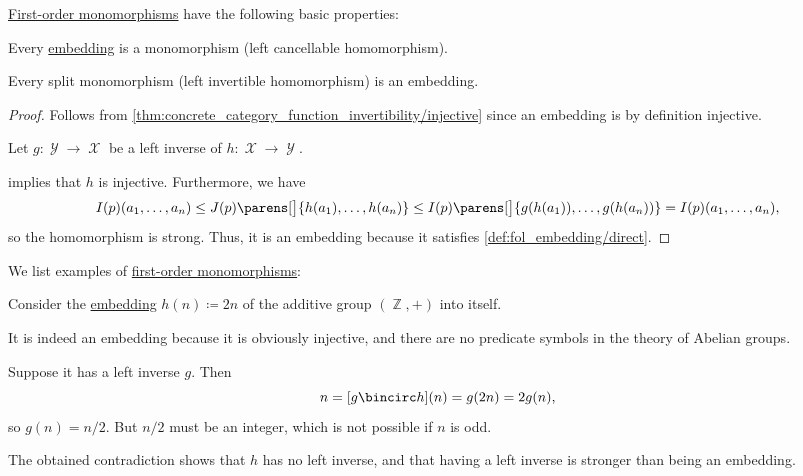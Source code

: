 \begin{proposition}\label{thm:def:fol_monomorphisms}
  \hyperref[def:fol_monomorphism]{First-order monomorphisms} have the following basic properties:
  \begin{thmenum}
     Every \hyperref[def:fol_embedding]{embedding} is a monomorphism (left cancellable homomorphism).

     Every split monomorphism (left invertible homomorphism) is an embedding.
  \end{thmenum}
\end{proposition}
\begin{proof}
   Follows from \cref{thm:concrete_category_function_invertibility/injective} since an embedding is by definition injective.

   Let \( g: \mscrY \to \mscrX \) be a left inverse of \( h: \mscrX \to \mscrY \).

   implies that \( h \) is injective. Furthermore, we have
  \begin{equation*}
    I(p)(a_1, \ldots, a_n)
    \leq
    J(p)\parens[\big]{ h(a_1), \ldots, h(a_n) }
    \leq
    I(p)\parens[\big]{ g(h(a_1)), \ldots, g(h(a_n)) }
    =
    I(p)(a_1, \ldots, a_n),
  \end{equation*}
  so the homomorphism is strong. Thus, it is an embedding because it satisfies \cref{def:fol_embedding/direct}.
\end{proof}

\begin{example}\label{ex:def:fol_monomorphism}
  We list examples of \hyperref[def:fol_monomorphism]{first-order monomorphisms}:
  \begin{thmenum}
     Consider the \hyperref[def:fol_embedding]{embedding} \( h(n) \coloneqq 2n \) of the additive group \( (\BbbZ, +) \) into itself.

    It is indeed an embedding because it is obviously injective, and there are no predicate symbols in the theory of Abelian groups.

    Suppose it has a left inverse \( g \). Then
    \begin{equation*}
      n = [g \bincirc h](n) = g(2n) = 2 g(n),
    \end{equation*}
    so \( g(n) = n / 2 \). But \( n / 2 \) must be an integer, which is not possible if \( n \) is odd.

    The obtained contradiction shows that \( h \) has no left inverse, and that having a left inverse is stronger than being an embedding.
  \end{thmenum}
\end{example}

